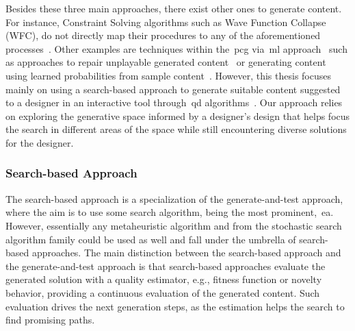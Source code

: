 Besides these three main approaches, there exist other ones to generate content. For instance, Constraint Solving algorithms such as Wave Function Collapse (WFC), do not directly map their procedures to any of the aforementioned processes~\cite{karth_wavefunctioncollapse_2017,karth_addressing_2019}. Other examples are techniques within the~\acrshort{pcg} via~\acrshort{ml} approach~\cite{summerville_procedural_2018} such as approaches to repair unplayable generated content~\cite{zhang_video_2020} or generating content using learned probabilities from sample content~\cite{dahlskog_multi-level_2014}. However, this thesis focuses mainly on using a search-based approach to generate suitable content suggested to a designer in an interactive tool through~\acrshort{qd} algorithms~\cite{gravina_procedural_2019}. Our approach relies on exploring the generative space informed by a designer's design that helps focus the search in different areas of the space while still encountering diverse solutions for the designer.





\subsubsection{Search-based Approach}

The search-based approach is a specialization of the generate-and-test approach, where the aim is to use some search algorithm, being the most prominent,~\acrlong{ea}. However, essentially any metaheuristic algorithm and from the stochastic search algorithm family could be used as well and fall under the umbrella of search-based approaches. The main distinction between the search-based approach and the generate-and-test approach is that search-based approaches evaluate the generated solution with a quality estimator, e.g., fitness function or novelty behavior, providing a continuous evaluation of the generated content. Such evaluation drives the next generation steps, as the estimation helps the search to find promising paths.

